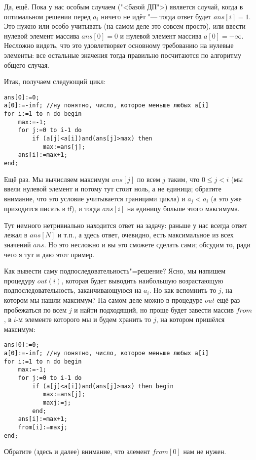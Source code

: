 Да, ещё. Пока у нас особым случаем ("<базой ДП">) является случай, когда в оптимальном решении перед $a_i$ ничего не идёт "--- тогда ответ будет $ans[i]=1$. Это нужно или особо учитывать (на самом деле это совсем просто), или ввести нулевой элемент массива $ans[0]=0$ и нулевой элемент массива $a[0]=-\infty$. Несложно видеть, что это удовлетворяет основному требованию на нулевые элементы: все остальные значения тогда правильно посчитаются по алгоритму общего случая.

Итак, получаем следующий цикл:
\begin{codesampleo}\begin{verbatim}
ans[0]:=0;
a[0]:=-inf; //ну понятно, число, которое меньше любых a[i]
for i:=1 to n do begin
    max:=-1; 
    for j:=0 to i-1 do
        if (a[j]<a[i])and(ans[j]>max) then
           max:=ans[j];
    ans[i]:=max+1;
end;
\end{verbatim}
\end{codesampleo}
Ещё раз. Мы вычисляем максимум $ans[j]$ по всем $j$ таким, что $0\leq j<i$ (мы ввели нулевой элемент и потому тут стоит ноль, а не единица; обратите внимание, что это условие учитывается границами цикла) и $a_j<a_i$ (а это уже приходится писать в if), и тогда $ans[i]$ на единицу больше этого максимума.

Тут немного нетривиально находится ответ на задачу: раньше у нас всегда ответ лежал в $ans[N]$ и т.п., а здесь ответ, очевидно, есть максимальное из всех значений $ans$. Но это несложно и вы это сможете сделать сами; обсудим то, ради чего я тут и даю этот пример.

Как вывести саму подпоследовательность"=решение? Ясно, мы напишем процедуру $out(i)$, которая будет выводить наибольшую возрастающую подпоследовательность, заканчивающуюся на $a_i$. Но как вспомнить то $j$, на котором мы нашли максимум? На самом деле можно в процедуре $out$ ещё раз пробежаться по всем $j$ и найти подходящий, но проще будет завести массив $from$, в $i$-м элементе которого мы и будем хранить то $j$, на котором пришёлся максимум:
\begin{codesampleo}\begin{verbatim}
ans[0]:=0;
a[0]:=-inf; //ну понятно, число, которое меньше любых a[i]
for i:=1 to n do begin
    max:=-1; 
    for j:=0 to i-1 do
        if (a[j]<a[i])and(ans[j]>max) then begin
           max:=ans[j];
           maxj:=j;
        end;
    ans[i]:=max+1;
    from[i]:=maxj;
end;
\end{verbatim}
\end{codesampleo}
Обратите (здесь и далее) внимание, что элемент $from[0]$ нам не нужен.

